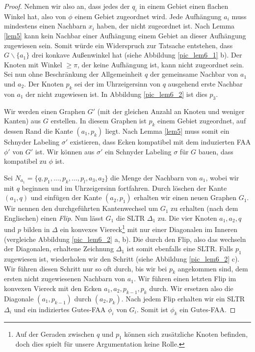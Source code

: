 \begin{proof}
Nehmen wir also an, dass jedes der $q_i$ in einem Gebiet einen flachen Winkel hat, also von $\phi$ einem Gebiet zugeordnet wird. Jede Aufhängung $a_i$ muss mindestens einen Nachbarn $x_i$ haben, der nicht zugeordnet ist. Nach Lemma \ref{lem5} kann kein Nachbar einer Aufhängung einem Gebiet an dieser Aufhängung zugewiesen sein. Somit würde ein Widerspruch zur Tatsache entstehen, dass $G\backslash \{a_1\}$ drei konkave Außenwinkel hat (siehe Abbildung \ref{pic_lem6_1} b). Der Knoten mit Winkel $\geq \pi$, der keine Aufhängung ist, kann nicht zugeordnet sein. Sei nun ohne Beschränkung der Allgemeinheit $q$ der gemeinsame Nachbar von $a_1$ und $a_2$. Der Knoten $p_k$ sei der im Uhrzeigersinn von $q$ ausgehend erste Nachbar von $a_1$ der nicht zugewiesen ist. In Abbildung \ref{pic_lem6_2} ist dies $p_3$.

Wir werden einen Graphen $G'$ (mit der gleichen Anzahl an Knoten und weniger Kanten) aus $G$ erstellen. In diesem Graphen ist $p_k$ einem Gebiet zugeordnet, auf dessen Rand die Kante $(a_1,p_k)$ liegt. Nach Lemma \ref{lem5} muss somit ein Schnyder Labeling $\sigma'$ existieren, dass Ecken kompatibel mit dem induzierten FAA $\phi'$ von $G'$ ist. Wir können aus $\sigma'$ ein Schnyder Labeling $\sigma$ für $G$ bauen, dass kompatibel zu $\phi$ ist.

Sei $N_{a_1} = \{q,p_1,\ldots,p_k,\ldots,p_l,a_3,a_2\}$ die Menge der Nachbarn von $a_1$, wobei wir mit $q$ beginnen und im Uhrzeigersinn fortfahren. Durch löschen der Kante $(a_1,q)$ und einfügen der Kante $(a_2,p_1)$ erhalten wir einen neuen Graphen $G_1$. Wir nennen den durchgeführten Kantenwechsel um $G_1$ zu erhalten (nach dem Englischen) einen \textit{Flip}. Nun lässt $G_1$ die SLTR $\Delta_1$ zu. Die vier Knoten $a_1,a_2,q$ und $p$ bilden in $\Delta$ ein konvexes Viereck\footnote{Auf der Geraden zwischen $q$ und $p_1$ können sich zusätzliche Knoten befinden, doch dies spielt für unsere Argumentation keine Rolle.} mit nur einer Diagonalen im Inneren (vergleiche Abbildung \ref{pic_lem6_2} a, b). Die durch den Flip, also das wechseln der Diagonalen, erhaltene Zeichnung $\Delta_1$ ist somit ebenfalls eine SLTR. Falls $p_1$ zugewiesen ist, wiederholen wir den Schritt (siehe Abbildung \ref{pic_lem6_2} c). Wir führen diesen Schritt nur so oft durch, bis wir bei $p_k$ angekommen sind, dem ersten nicht zugewiesenen Nachbarn von $a_1$. Wir führen einen letzten Flip im konvexen Viereck mit den Ecken $a_1,a_2,p_{k-1},p_k$ durch. Wir ersetzen also die Diagonale $(a_1,p_{k-1})$ durch $(a_2,p_{k})$. Nach jedem Flip erhalten wir ein SLTR $\Delta_i$ und ein indiziertes Gutes-FAA $\phi_i$ von $G_i$. Somit ist $\phi_k$ ein Gutes-FAA.


\end{proof}
